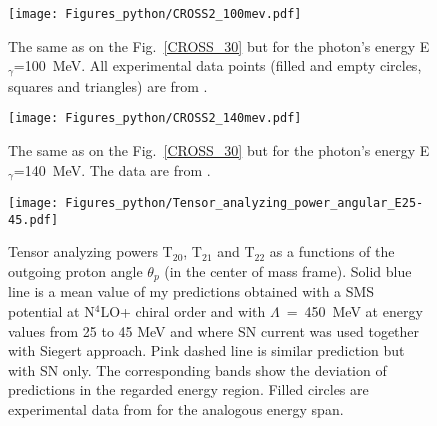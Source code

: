     \begin{figure}[h]
        \begin{center}
        \texttt{[image: Figures\_python/CROSS2\_100mev.pdf]}
        \end{center}
        \caption{The same as on the Fig.~\ref{CROSS_30} but for the photon's energy E$_\gamma$=100~MeV.
        All experimental data points (filled and empty circles, squares and triangles) are from \cite{Ying_Experiment_Deut}.}
        \label{CROSS_100}
    \end{figure}

    \begin{figure}[h]
        \begin{center}
        \texttt{[image: Figures\_python/CROSS2\_140mev.pdf]}
        \end{center}
        \caption{The same as on the Fig.~\ref{CROSS_30} but for the photon's energy E$_\gamma$=140~MeV.
        The data are from \cite{DeSanctis_Experiment_Deut}.}
        \label{CROSS_140}
    \end{figure}
        



    \begin{figure}[h]
        \begin{center}
        \texttt{[image: Figures\_python/Tensor\_analyzing\_power\_angular\_E25-45.pdf]}
        \end{center}
        \caption{Tensor analyzing powers T$_{20}$, T$_{21}$ and T$_{22}$ as a functions of the
        outgoing proton angle $\theta_p$ (in the center of mass frame).
        Solid blue line is a mean value of my predictions obtained with a
        SMS potential at N$^4$LO+ chiral order and with $\Lambda$~=~450~MeV
        at energy values from 25 to 45 MeV and
        where SN current was used together with Siegert approach. 
        Pink dashed line is similar prediction but with SN only. 
        The corresponding bands show the deviation of predictions in the regarded
        energy region.
        Filled circles are experimental data
        from \cite{rachek2007} for the analogous energy span.}
        \label{tensor_angular_25-45}
    \end{figure}

